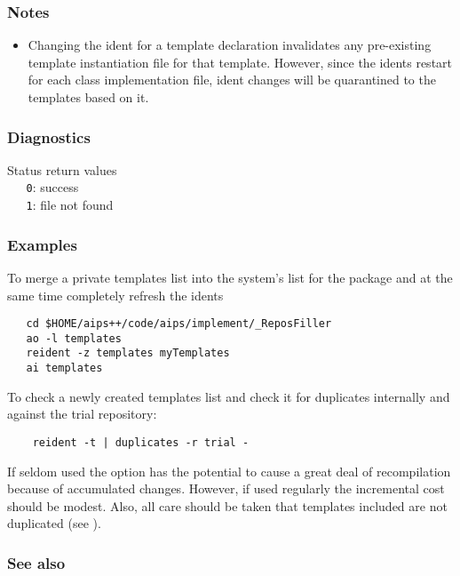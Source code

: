 \subsubsection*{Notes}

\begin{itemize}
\item
    Changing the ident for a template declaration invalidates any pre-existing
    template instantiation  file for that template.  However, since
    the idents restart for each class implementation  file, ident
    changes will be quarantined to the templates based on it.
\end{itemize}

\subsubsection*{Diagnostics}

Status return values
\\ \verb+   0+: success
\\ \verb+   1+: file not found

\subsubsection*{Examples}

To merge a private templates list into the system's list for the 
package and at the same time completely refresh the idents

\begin{verbatim}
   cd $HOME/aips++/code/aips/implement/_ReposFiller
   ao -l templates
   reident -z templates myTemplates
   ai templates
\end{verbatim}

To check a newly created templates list and check it for duplicates
internally and against the trial repository:

\begin{verbatim}
    reident -t | duplicates -r trial -
\end{verbatim}



\noindent
If seldom used the  option has the potential to cause a great deal of
recompilation because of accumulated changes.  However, if used regularly the
incremental cost should be modest. Also, all care should be taken that
templates included are not duplicated (see ).

\subsubsection*{See also}

